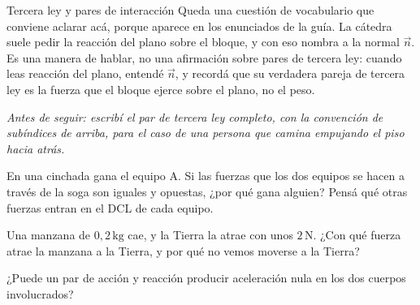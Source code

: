 \documentclass[11pt,openany]{book}
\begin{document}
\begin{bloque}{Tercera ley y pares de interacción}
Queda una cuestión de vocabulario que conviene aclarar acá, porque aparece en los enunciados de la guía. La cátedra suele pedir la reacción del plano sobre el bloque, y con eso nombra a la normal $\vec n$. Es una manera de hablar, no una afirmación sobre pares de tercera ley: cuando leas reacción del plano, entendé $\vec n$, y recordá que su verdadera pareja de tercera ley es la fuerza que el bloque ejerce sobre el plano, no el peso.

\textit{Antes de seguir: escribí el par de tercera ley completo, con la convención de subíndices de arriba, para el caso de una persona que camina empujando el piso hacia atrás.}
\end{bloque}

\begin{chequeo}
\item En una cinchada gana el equipo A. Si las fuerzas que los dos equipos se hacen a través de la soga son iguales y opuestas, ¿por qué gana alguien? Pensá qué otras fuerzas entran en el DCL de cada equipo.
\item Una manzana de $0{,}2\,\mathrm{kg}$ cae, y la Tierra la atrae con unos $2\,\mathrm{N}$. ¿Con qué fuerza atrae la manzana a la Tierra, y por qué no vemos moverse a la Tierra?
\item ¿Puede un par de acción y reacción producir aceleración nula en los dos cuerpos involucrados?
\end{chequeo}
\end{document}
